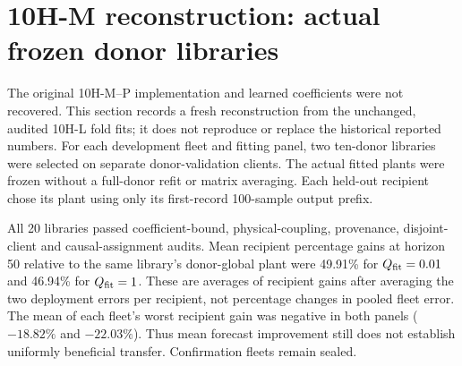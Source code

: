 \section{10H-M reconstruction: actual frozen donor libraries}
The original 10H-M--P implementation and learned coefficients were not recovered.
This section records a fresh reconstruction from the unchanged, audited 10H-L
fold fits; it does not reproduce or replace the historical reported numbers.
For each development fleet and fitting panel, two ten-donor libraries were
selected on separate donor-validation clients. The actual fitted plants were
frozen without a full-donor refit or matrix averaging. Each held-out recipient
chose its plant using only its first-record 100-sample output prefix.

All 20 libraries passed coefficient-bound, physical-coupling, provenance,
disjoint-client and causal-assignment audits. Mean recipient percentage gains
at horizon 50 relative to the same library's donor-global plant were
49.91\% for $Q_{\rm fit}=0.01$ and 46.94\% for $Q_{\rm fit}=1$.
These are averages of recipient gains after averaging the two deployment
errors per recipient, not percentage changes in pooled fleet error. The mean
of each fleet's worst recipient gain was negative in both panels
($-18.82\%$ and $-22.03\%$). Thus mean forecast improvement still does not
establish uniformly beneficial transfer. Confirmation fleets remain sealed.
